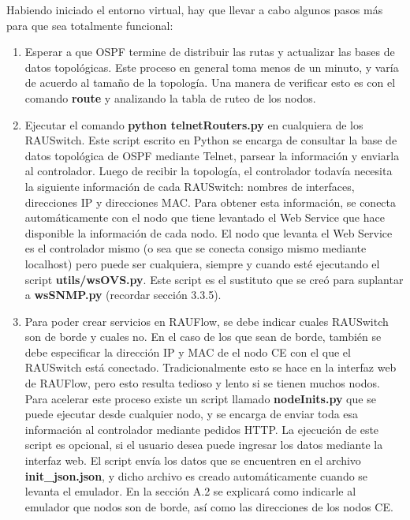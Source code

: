 Habiendo iniciado el entorno virtual, hay que llevar a cabo algunos pasos más para que sea totalmente funcional:
\begin{enumerate}
	\item Esperar a que OSPF termine de distribuir las rutas y actualizar las bases de datos topológicas. Este proceso en general toma menos de un minuto, y varía de acuerdo al tamaño de la topología. Una manera de verificar esto es con el comando \textbf{route} y analizando la tabla de ruteo de los nodos.
	\item Ejecutar el comando \textbf{python telnetRouters.py} en cualquiera de los RAUSwitch. Este script escrito en Python se encarga de consultar la base de datos topológica de OSPF mediante Telnet, parsear la información y enviarla al controlador. Luego de recibir la topología, el controlador todavía necesita la siguiente información de cada RAUSwitch: nombres de interfaces, direcciones IP y direcciones MAC. Para obtener esta información, se conecta automáticamente con el nodo que tiene levantado el Web Service que hace disponible la información de cada nodo. El nodo que levanta el Web Service es el controlador mismo (o sea que se conecta consigo mismo mediante localhost) pero puede ser cualquiera, siempre y cuando esté ejecutando el script \textbf{utils/wsOVS.py}. Este script es el sustituto que se creó para suplantar a \textbf{wsSNMP.py} (recordar sección 3.3.5).
	\item Para poder crear servicios en RAUFlow, se debe indicar cuales RAUSwitch son de borde y cuales no. En el caso de los que sean de borde, también se debe especificar la dirección IP y MAC de el nodo CE con el que el RAUSwitch está conectado. Tradicionalmente esto se hace en la interfaz web de RAUFlow, pero esto resulta tedioso y lento si se tienen muchos nodos. Para acelerar este proceso existe un script llamado \textbf{nodeInits.py} que se puede ejecutar desde cualquier nodo, y se encarga de enviar toda esa información al controlador mediante pedidos HTTP. La ejecución de este script es opcional, si el usuario desea puede ingresar los datos mediante la interfaz web. El script envía los datos que se encuentren en el archivo \textbf{init\_json.json}, y dicho archivo es creado automáticamente cuando se levanta el emulador. En la sección A.2 se explicará como indicarle al emulador que nodos son de borde, así como las direcciones de los nodos CE.
\end{enumerate}

